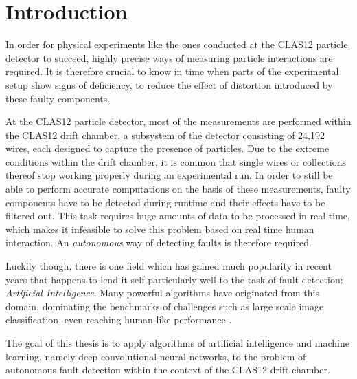 \chapter{Introduction}

In order for physical experiments like the ones conducted at the
CLAS12 particle detector to succeed, highly precise ways of measuring
particle interactions are required. It is therefore crucial to know in
time when parts of the experimental setup show signs of deficiency,
to reduce the effect of distortion introduced by these faulty
components.

At the CLAS12 particle detector, most of the measurements are
performed within the CLAS12 drift chamber, a subsystem of the detector
consisting of 24,192 wires, each designed to capture the presence of
particles. Due to the extreme conditions within the drift chamber, it
is common that single wires or collections thereof stop working
properly during an experimental run. In order to still be able to
perform accurate computations on the basis of these measurements,
faulty components have to be detected during runtime and their effects
have to be filtered out. This task requires huge amounts of data to be
processed in real time, which makes it infeasible to solve this
problem based on real time human interaction. An \textit{autonomous}
way of detecting faults is therefore required.

Luckily though, there is one field which has gained much popularity
in recent years that happens to lend it self particularly well to
the task of fault detection: \textit{Artificial
  Intelligence}. Many powerful algorithms have originated from this
domain, dominating the benchmarks of challenges such
as large scale image classification, even reaching human like
performance \cite{Russakovsky}.

The goal of this thesis is to apply algorithms of artificial
intelligence and machine learning, namely deep convolutional neural
networks, to the problem of autonomous fault detection within the
context of the CLAS12 drift chamber. 
